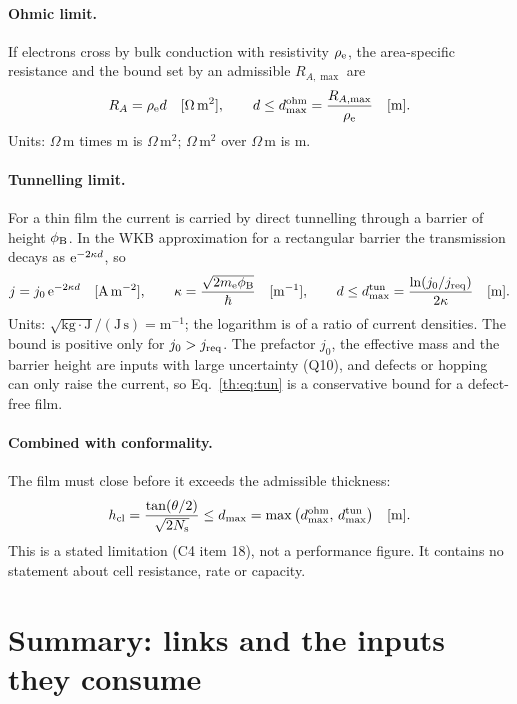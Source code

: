 \paragraph{Ohmic limit.} If electrons cross by bulk conduction with resistivity $\rho_\mathrm{e}$, the
area-specific resistance and the bound set by an admissible $R_{A,\max}$ are
\begin{equation}\label{th:eq:ohm}
R_A=\rho_\mathrm{e} d \quad[\mathrm{\Omega\,m^{2}}],\qquad d\le d_\mathrm{max}^\mathrm{ohm}=\frac{R_{A,\max}}{\rho_\mathrm{e}} \quad[\mathrm{m}].
\end{equation}
Units: $\Omega$\,m times m is $\Omega$\,m$^{2}$; $\Omega$\,m$^{2}$ over $\Omega$\,m is m.

\paragraph{Tunnelling limit.} For a thin film the current is carried by direct tunnelling through
a barrier of height $\phi_\mathrm{B}$. In the WKB approximation for a rectangular barrier the transmission
decays as $\mathrm{e}^{-2\kappa d}$, so
\begin{equation}\label{th:eq:tun}
j=j_0\,\mathrm{e}^{-2\kappa d} \quad[\mathrm{A\,m^{-2}}],\qquad \kappa=\frac{\sqrt{2m_\mathrm{e}\phi_\mathrm{B}}}{\hbar} \quad[\mathrm{m^{-1}}],\qquad
d\le d_\mathrm{max}^\mathrm{tun}=\frac{\ln(j_0/j_\mathrm{req})}{2\kappa} \quad[\mathrm{m}].
\end{equation}
Units: $\sqrt{\mathrm{kg\cdot J}}/(\mathrm{J\,s})=\mathrm{m}^{-1}$; the logarithm is of a ratio of current
densities. The bound is positive only for $j_0>j_\mathrm{req}$. The prefactor $j_0$, the effective mass and
the barrier height are inputs with large uncertainty (Q10), and defects or hopping can only raise
the current, so Eq.~\eqref{th:eq:tun} is a conservative bound for a defect-free film.

\paragraph{Combined with conformality.} The film must close before it exceeds the admissible
thickness:
\begin{equation}\label{th:eq:combined}
h_\mathrm{cl}=\frac{\tan(\theta/2)}{\sqrt{2N_\mathrm{s}}}\le d_\mathrm{max}=\max\big(d_\mathrm{max}^\mathrm{ohm},\,d_\mathrm{max}^\mathrm{tun}\big) \quad[\mathrm{m}].
\end{equation}
This is a stated limitation (C4 item 18), not a performance figure. It contains no statement
about cell resistance, rate or capacity.

\section{Summary: links and the inputs they consume}\label{th:sec:summary}

